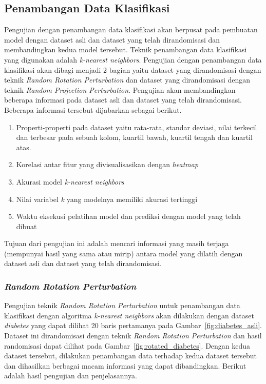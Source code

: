 \subsection{Penambangan Data Klasifikasi}
\label{subsec:pengujian-klasifikasi}
Pengujian dengan penambangan data klasifikasi akan berpusat pada pembuatan model dengan dataset asli dan dataset yang telah dirandomisasi dan membandingkan kedua model tersebut. Teknik penambangan data klasifikasi yang digunakan adalah \textit{k-nearest neighbors}. Pengujian dengan penambangan data klasifikasi akan dibagi menjadi 2 bagian yaitu dataset yang dirandomisasi dengan teknik \textit{Random Rotation Perturbation} dan dataset yang dirandomisasi dengan teknik \textit{Random Projection Perturbation}. Pengujian akan membandingkan beberapa informasi pada dataset asli dan dataset yang telah dirandomisasi. Beberapa informasi tersebut dijabarkan sebagai berikut.
\begin{enumerate}
	\item Properti-properti pada dataset yaitu rata-rata, standar deviasi, nilai terkecil dan terbesar pada sebuah kolom, kuartil bawah, kuartil tengah dan kuartil atas.
	\item Korelasi antar fitur yang divisualisasikan dengan \textit{heatmap}
	\item Akurasi model \textit{k-nearest neighbors}
	\item Nilai variabel \textit{k} yang modelnya memiliki akurasi tertinggi
	\item Waktu eksekusi pelatihan model dan prediksi dengan model yang telah dibuat
\end{enumerate}
Tujuan dari pengujian ini adalah mencari informasi yang masih terjaga (mempunyai hasil yang sama atau mirip) antara model yang dilatih dengan dataset asli dan dataset yang telah dirandomisasi.

\subsubsection{\textit{Random Rotation Perturbation}}
\label{subsubsec:pengujian-klasifikasi-rrp}

Pengujian teknik \textit{Random Rotation Perturbation} untuk penambangan data klasifikasi dengan algoritma \textit{k-nearest neighbors} akan dilakukan dengan dataset \textit{diabetes} yang dapat dilihat 20 baris pertamanya pada Gambar~\ref{fig:diabetes_asli}. Dataset ini dirandomisasi dengan teknik \textit{Random Rotation Perturbation} dan hasil randomisasi dapat dilihat pada Gambar~\ref{fig:rotated_diabetes}. Dengan kedua dataset tersebut, dilakukan penambangan data terhadap kedua dataset tersebut dan dihasilkan berbagai macam informasi yang dapat dibandingkan. Berikut adalah hasil pengujian dan penjelasannya.

